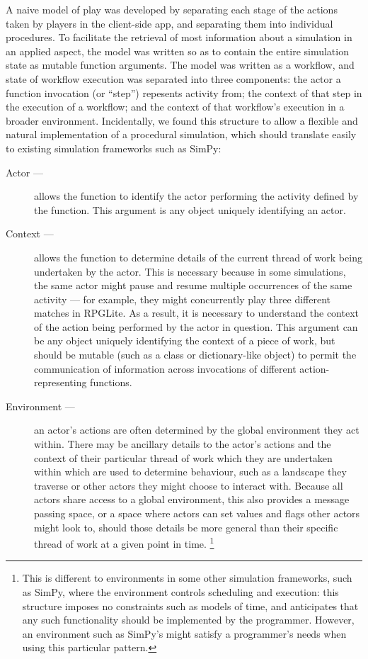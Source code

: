 
A naive model of play was developed by separating each stage of the actions
taken by players in the client-side app, and separating them into individual
procedures. To facilitate the retrieval of most information about a simulation
in an applied aspect, the model was written so as to contain the entire
simulation state as mutable function arguments. The model was written as a
workflow, and state of workflow execution was separated into three components:
the actor a function invocation (or ``step'') repesents activity from; the
context of that step in the execution of a workflow; and the context of that
workflow's execution in a broader environment. Incidentally, we found this
structure to allow a flexible and natural implementation of a procedural
simulation, which should translate easily to existing simulation frameworks such
as SimPy\cite{simpy_intro}:

\begin{description}
  \item[Actor ---] allows the function to identify the actor performing the activity
    defined by the function. This argument is any object uniquely identifying an
    actor.
  \item[Context ---] allows the function to determine details of the current
    thread of work being undertaken by the actor. This is necessary because in
    some simulations, the same actor might pause and resume multiple occurrences
    of the same activity --- for example, they might concurrently play three
    different matches in RPGLite. As a result, it is necessary to understand the
    context of the action being performed by the actor in question. This
    argument can be any object uniquely identifying the context of a piece of
    work, but should be mutable (such as a class or dictionary-like object) to
    permit the communication of information across invocations of different
    action-representing functions.
  \item[Environment ---] an actor's actions are often determined by the global
    environment they act within. There may be ancillary details to the
    actor's actions and the context of their particular thread of work which
    they are undertaken within which are used to determine behaviour, such
    as a landscape they traverse or other actors they might choose to
    interact with. Because all actors share access to a global environment,
    this also provides a message passing space, or a space where actors can
    set values and flags other actors might look to, should those details be
    more general than their specific thread of work at a given point in time.
    \footnote{This is different to environments in some other simulation frameworks, such
    as SimPy\cite{simpy_documentation}, where the environment controls scheduling and
    execution: this structure imposes no constraints such as models of time, and
    anticipates that any such functionality should be implemented by the
    programmer. However, an environment such as SimPy's might satisfy a programmer's needs
    when using this particular pattern.}
\end{description}

